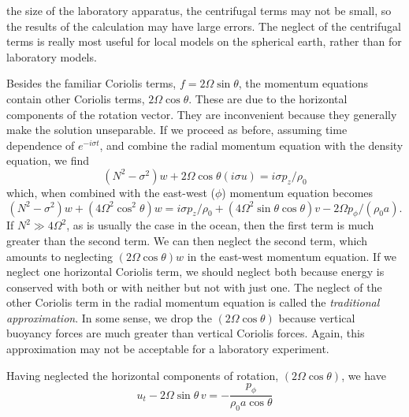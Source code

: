 \sourcepagebreak

the size of the laboratory apparatus, the centrifugal terms may not be small, so the
results of the calculation may have large errors. The neglect of the centrifugal terms is
really most useful for local models on the spherical earth, rather than for laboratory
models.

Besides the familiar Coriolis terms, $f=2\Omega\sin\theta$, the momentum equations
contain other Coriolis terms, $2\Omega\cos\theta$. These are due to the horizontal components of
the rotation vector. They are inconvenient because they generally make the solution
unseparable. If we proceed as before, assuming time dependence of $e^{-i\sigma t}$, and combine
the radial momentum equation with the density equation, we find
\[
	(N^2-\sigma^2)w+2\Omega\cos\theta(i\sigma u)=i\sigma p_z/\rho_0
\]
which, when combined with the east-west ($\phi$) momentum equation becomes
\[
	(N^2-\sigma^2)w+(4\Omega^2\cos^2\theta)w
	=i\sigma p_z/\rho_0+(4\Omega^2\sin\theta\cos\theta)v
	-2\Omega p_\phi/(\rho_0a).
\]
If $N^2\gg4\Omega^2$, as is usually the case in the ocean, then the first term is much greater
than the second term. We can then neglect the second term, which amounts to
neglecting $(2\Omega\cos\theta)w$ in the east-west momentum equation. If we neglect one
horizontal Coriolis term, we should neglect both because energy is conserved with both
or with neither but not with just one. The neglect of the other Coriolis term in the
radial momentum equation is called the \emph{traditional approximation}. In some sense, we
drop the $(2\Omega\cos\theta)$ because vertical buoyancy forces are much greater than vertical
Coriolis forces. Again, this approximation may not be acceptable for a laboratory
experiment.

Having neglected the horizontal components of rotation, $(2\Omega\cos\theta)$, we have
\[
	u_t-2\Omega\sin\theta\,v=-\frac{p_\phi}{\rho_0a\cos\theta}
\]

\sourcepagebreak


